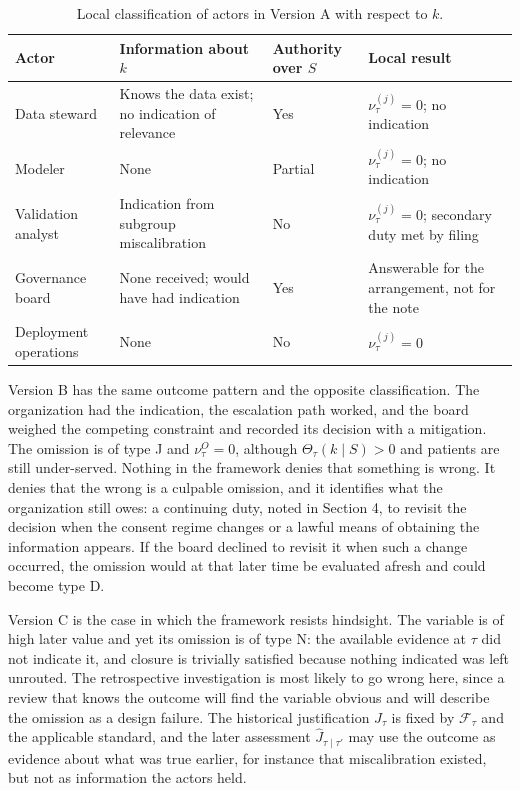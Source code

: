 \documentclass[11pt]{article}
\newcommand{\F}{\mathcal F}
\newcommand{\Th}{\Theta}
\theoremstyle{plain}
\theoremstyle{definition}
\begin{document}
\begin{table}[h]
\centering
\small
\renewcommand{\arraystretch}{1.3}
\begin{tabular}{p{2.6cm}p{3.7cm}p{2.4cm}p{3.2cm}}
\hline
Actor & Information about $k$ & Authority over $S$ & Local result \\
\hline
Data steward & Knows the data exist; no indication of relevance & Yes & $\nu^{(j)}_\tau=0$; no indication \\
Modeler & None & Partial & $\nu^{(j)}_\tau=0$; no indication \\
Validation analyst & Indication from subgroup miscalibration & No & $\nu^{(j)}_\tau=0$; secondary duty met by filing \\
Governance board & None received; would have had indication & Yes & Answerable for the arrangement, not for the note \\
Deployment operations & None & No & $\nu^{(j)}_\tau=0$ \\
\hline
\end{tabular}
\caption{Local classification of actors in Version A with respect to $k$.}
\label{tab:actors}
\end{table}

Version B has the same outcome pattern and the opposite classification. The organization had the indication, the escalation path worked, and the board weighed the competing constraint and recorded its decision with a mitigation. The omission is of type J and $\nu^{O}_\tau=0$, although $\Th_\tau(k\mid S)>0$ and patients are still under-served. Nothing in the framework denies that something is wrong. It denies that the wrong is a culpable omission, and it identifies what the organization still owes: a continuing duty, noted in Section 4, to revisit the decision when the consent regime changes or a lawful means of obtaining the information appears. If the board declined to revisit it when such a change occurred, the omission would at that later time be evaluated afresh and could become type D.

Version C is the case in which the framework resists hindsight. The variable is of high later value and yet its omission is of type N: the available evidence at $\tau$ did not indicate it, and closure is trivially satisfied because nothing indicated was left unrouted. The retrospective investigation is most likely to go wrong here, since a review that knows the outcome will find the variable obvious and will describe the omission as a design failure. The historical justification $J_\tau$ is fixed by $\F_\tau$ and the applicable standard, and the later assessment $\widehat J_{\tau\mid\tau'}$ may use the outcome as evidence about what was true earlier, for instance that miscalibration existed, but not as information the actors held.
\end{document}
